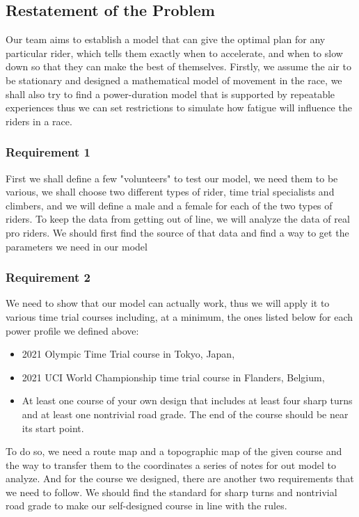 \documentclass[12pt]{article}
\begin{document}
\subsection{Restatement of the Problem}
Our team aims to establish a model that can give the optimal plan for any particular rider, which tells them exactly when to accelerate,
and when to slow down so that they can make the best of themselves. Firstly, we assume the air to be stationary and designed a mathematical model of movement
in the race, we shall also try to find a power-duration model that is supported by repeatable experiences thus we can  set restrictions  to simulate how fatigue
will influence the riders in a race.
\subsubsection{Requirement 1}
First we shall define a few "volunteers" to test our model, we need them to be various, we shall choose two different types of rider, time trial
specialists and climbers, and we will define a male and a female for each of the two types of riders. To keep the data from getting out of line, we will analyze the data of
real pro riders. We should first find the source of that data and find a way to get the parameters we need in our model
\subsubsection{Requirement 2}
We need to show that our model can actually work, thus we will apply it to various time trial courses including, at a minimum, the ones listed
below for each power profile we defined above:
\begin{itemize}
    \item 2021 Olympic Time Trial course in Tokyo, Japan,
    \item 2021 UCI World Championship time trial course in Flanders, Belgium,
    \item At least one course of your own design that includes at least four sharp turns and
          at least one nontrivial road grade. The end of the course should be near its start
          point.
\end{itemize}
To do so, we need a route map and a topographic map of the given course and the way to transfer them to the coordinates a series of notes for out model to analyze.
And for the course we designed, there are another two requirements that we need to follow.
We should find the standard for sharp turns and nontrivial road grade to make our self-designed course in line with the rules.
\end{document}
